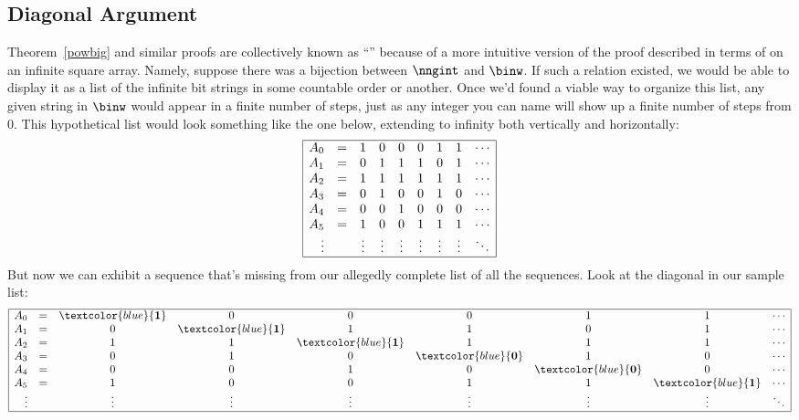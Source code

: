 \subsection{Diagonal Argument}
Theorem~\ref{powbig} and similar proofs are collectively known as
``'' because of a
more intuitive version of the proof described in terms of on an
infinite square array.  Namely, suppose there was a bijection between
$\nngint$ and $\binw$.  If such a relation existed, we would be able
to display it as a list of the infinite bit strings in some countable
order or another.  Once we'd found a viable way to organize this list,
any given string in $\binw$ would appear in a finite number of steps,
just as any integer you can name will show up a finite number of steps
from 0.  This hypothetical list would look something like the one
below, extending to infinity both vertically and horizontally:
\[\begin{array}{|rc c c c c c c l|}
\hline
A_0 &=  & 1 & 0 & 0 & 0 & 1 & 1 & \cdots\\
A_1 &=  & 0 & 1 & 1 & 1 & 0 & 1 & \cdots\\
A_2 &=  & 1 & 1 & 1 & 1 & 1 & 1 & \cdots\\
A_3 &=  & 0 & 1 & 0 & 0 & 1 & 0 & \cdots\\
A_4 &=  & 0 & 0 & 1 & 0 & 0 & 0 & \cdots\\
A_5 &=  & 1 & 0 & 0 & 1 & 1 & 1 & \cdots\\
\vdots & & \vdots & \vdots & \vdots & \vdots & \vdots &
         \vdots & \ddots\\
\hline
\end{array}\]
But now we can exhibit a sequence that's missing from our allegedly
complete list of all the sequences.  Look at the diagonal in our
sample list:
\[\begin{array}{|rc c c c c c c l|}
\hline
A_0 &=  & \textcolor{blue}{\mathbf{1}} & 0 & 0 & 0 & 1 & 1 & \cdots \\
A_1 &=  & 0 & \textcolor{blue}{\mathbf{1}} & 1 & 1 & 0 & 1 & \cdots \\
A_2 &=  & 1 & 1 & \textcolor{blue}{\mathbf{1}} & 1 & 1 & 1 & \cdots \\
A_3 &=  & 0 & 1 & 0 & \textcolor{blue}{\mathbf{0}} & 1 & 0 & \cdots \\
A_4 &=  & 0 & 0 & 1 & 0 & \textcolor{blue}{\mathbf{0}} & 0 & \cdots \\
A_5 &=  & 1 & 0 & 0 & 1 & 1 & \textcolor{blue}{\mathbf{1}} & \cdots \\
\vdots & & \vdots & \vdots & \vdots & \vdots & \vdots & \vdots & \ddots\\
\hline
\end{array}\]
